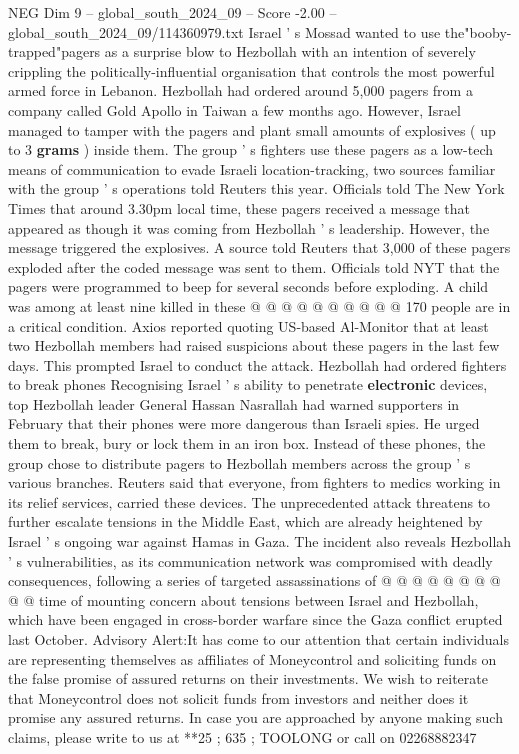 \begin{textsample}{NEG Dim 9 – global\_south\_2024\_09 – Score -2.00 – global\_south\_2024\_09/114360979.txt}  \label{ex:f9_neg_199}
Israel ' s Mossad wanted to use the"booby-trapped"pagers as a surprise blow to Hezbollah with an intention of severely crippling the politically-influential organisation that controls the most powerful armed force in Lebanon.
Hezbollah had ordered around 5,000 pagers from a company called Gold Apollo in Taiwan a few months ago.
However, Israel managed to tamper with the pagers and plant small amounts of explosives ( up to 3 \textbf{grams} ) inside them.
The group ' s fighters use these pagers as a low-tech means of communication to evade Israeli location-tracking, two sources familiar with the group ' s operations told Reuters this year.
Officials told The New York Times that around 3.30pm local time, these pagers received a message that appeared as though it was coming from Hezbollah ' s leadership.
However, the message triggered the explosives.
A source told Reuters that 3,000 of these pagers exploded after the coded message was sent to them.
Officials told NYT that the pagers were programmed to beep for several seconds before exploding.
A child was among at least nine killed in these @ @ @ @ @ @ @ @ @ @ 170 people are in a critical condition.
Axios reported quoting US-based Al-Monitor that at least two Hezbollah members had raised suspicions about these pagers in the last few days.
This prompted Israel to conduct the attack.
Hezbollah had ordered fighters to break phones Recognising Israel ' s ability to penetrate \textbf{electronic} devices, top Hezbollah leader General Hassan Nasrallah had warned supporters in February that their phones were more dangerous than Israeli spies.
He urged them to break, bury or lock them in an iron box.
Instead of these phones, the group chose to distribute pagers to Hezbollah members across the group ' s various branches.
Reuters said that everyone, from fighters to medics working in its relief services, carried these devices.
The unprecedented attack threatens to further escalate tensions in the Middle East, which are already heightened by Israel ' s ongoing war against Hamas in Gaza.
The incident also reveals Hezbollah ' s vulnerabilities, as its communication network was compromised with deadly consequences, following a series of targeted assassinations of @ @ @ @ @ @ @ @ @ @ time of mounting concern about tensions between Israel and Hezbollah, which have been engaged in cross-border warfare since the Gaza conflict erupted last October.
Advisory Alert:It has come to our attention that certain individuals are representing themselves as affiliates of Moneycontrol and soliciting funds on the false promise of assured returns on their investments.
We wish to reiterate that Moneycontrol does not solicit funds from investors and neither does it promise any assured returns.
In case you are approached by anyone making such claims, please write to us at **25 ; 635 ; TOOLONG or call on 02268882347

\end{textsample}
